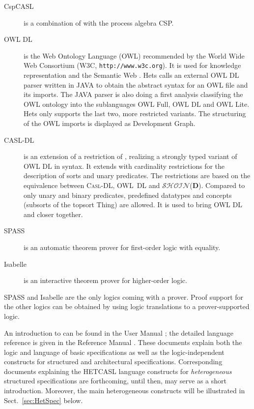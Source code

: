 \documentclass{article}
\newcommand{\normalTEXTSC}[2]{{#1\scriptsize#2}}
\newcommand{\CASLDL}{\textmd{\textsc{Casl-DL}}\xspace}
\newcommand{\SHOIN}{$\mathcal{SHOIN}$(\textbf{D})\xspace}
\newcommand{\HetCASL}{\normalTEXTSC{H}{ET}\normalTEXTSC{C}{ASL}\xspace}
\begin{document}
\begin{description}
\item[CspCASL] \cite{Roggenbach:2003:C-CN} is a combination of \CASL
  with the process algebra CSP.

\item[OWL DL] is the Web Ontology Language (OWL) recommended by the
  World Wide Web Consortium (W3C, \texttt{http://www.w3c.org}). It is
  used for knowledge representation and the Semantic Web
  \cite{berners:2001:SWeb}. 
Hets calls an external OWL DL parser
  written in JAVA to obtain the abstract syntax for an OWL file and its
  imports. The JAVA parser is also doing a first analysis classifying
  the OWL ontology into the sublanguages OWL Full, OWL DL and OWL
  Lite. 
 Hets only supports the last two, more restricted variants. 
The
  structuring of the OWL imports is displayed as Development Graph.

\item[CASL-DL] is an extension of a restriction of \CASL, realizing
a strongly typed variant of OWL DL in \CASL syntax.
It extends
  \CASL with cardinality restrictions for the description of sorts and
  unary predicates. The restrictions are based on the equivalence
  between \CASLDL, OWL~DL and \SHOIN. Compared to \CASL only unary
  and binary predicates, predefined datatypes and concepts (subsorts
  of the topsort Thing) are allowed. It is used to bring OWL DL and
  \CASL closer together.

\item[SPASS] \cite{WeidenbachEtAl02} is an automatic theorem prover for first-order logic
with equality.

\item[Isabelle] \cite{NipPauWen02} is an interactive theorem prover for higher-order
logic.
\end{description}
SPASS and Isabelle are the only logics coming with a prover. Proof
support for the other logics can be obtained by using logic translations
to a prover-supported logic.


An introduction to \CASL can be found in the \CASL User Manual
\cite{CASL/UserManual}; the detailed language reference is given in
the \CASL Reference Manual \cite{CASL/RefManual}.  These documents
explain both the \CASL logic and language of basic specifications as
well as the logic-independent constructs for structured and
architectural specifications.  Corresponding documents explaining the
\HetCASL language constructs for \emph{heterogeneous} structured specifications
are forthcoming, until then, \cite{Mossakowski:2003:FHS} may serve as a short
introduction. Moreover, the main heterogeneous constructs will be illustrated 
in Sect.~\ref{sec:HetSpec} below.
\end{document}

